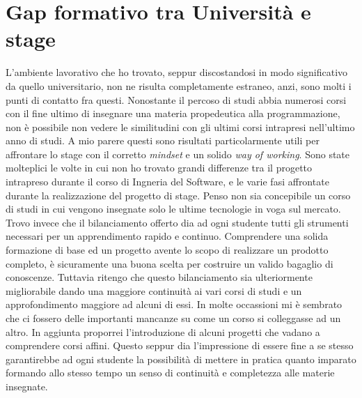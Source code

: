 \section{Gap formativo tra Università e stage}
L'ambiente lavorativo che ho trovato, seppur discostandosi in modo significativo da quello universitario, non ne risulta completamente estraneo, anzi, sono molti i punti di contatto fra questi.
Nonostante il percoso di studi abbia numerosi corsi con il fine ultimo di insegnare una materia propedeutica alla programmazione, non è possibile non vedere le similitudini
con gli ultimi corsi intrapresi nell'ultimo anno di studi. A mio parere questi sono risultati particolarmente utili per affrontare lo stage con il corretto \emph{mindset} e un solido \emph{way of working}.
Sono state molteplici le volte in cui non ho trovato grandi differenze tra il progetto intrapreso durante il corso di Ingneria del Software, e le varie fasi affrontate durante la realizzazione
del progetto di stage. Penso non sia concepibile un corso di studi in cui vengono insegnate solo le ultime tecnologie in voga sul mercato. 
Trovo invece che il bilanciamento offerto dia ad ogni studente tutti gli strumenti necessari per un apprendimento rapido e continuo.
Comprendere una solida formazione di base ed un progetto avente lo scopo di realizzare un prodotto completo, è sicuramente una buona scelta per costruire un valido bagaglio di conoscenze.
Tuttavia ritengo che questo bilanciamento sia ulteriormente migliorabile dando una maggiore continuità ai vari corsi di studi e un approfondimento maggiore ad alcuni di essi. 
In molte occassioni mi è sembrato che ci fossero delle importanti mancanze su come un corso si colleggasse ad un altro. In aggiunta proporrei l'introduzione di alcuni progetti che vadano a comprendere corsi affini.
Questo seppur dia l'impressione di essere fine a se stesso garantirebbe ad ogni studente la possibilità di mettere in pratica quanto imparato formando allo stesso tempo un senso di continuità e completezza alle materie
insegnate. 

%


